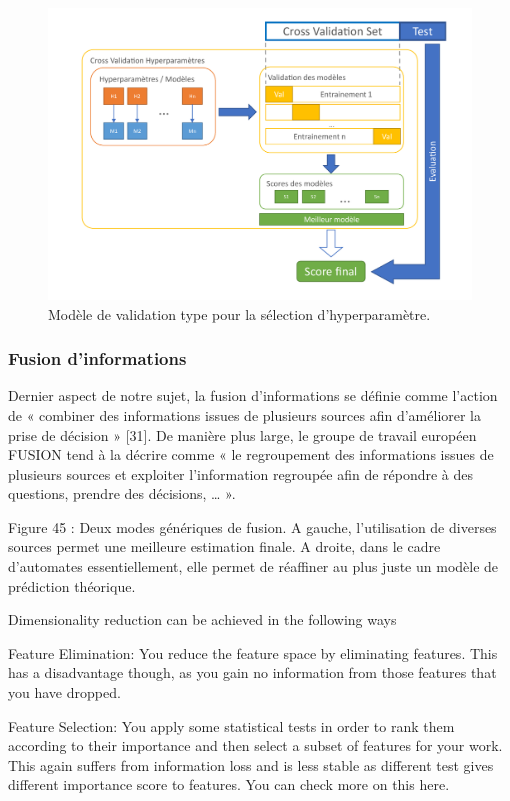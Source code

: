 \begin{figure}[H]
    \centering
    \includegraphics[width=\linewidth]{contents/chapter_3/resources/HyperParameterProcess.pdf}
    \caption{Modèle de validation type pour la sélection d’hyperparamètre.}
    \label{fig:chapter_3:HyperParameterProcess}
\end{figure}

\subsubsection{Fusion d’informations}
Dernier aspect de notre sujet, la fusion d’informations se définie comme l’action de « combiner des informations issues de plusieurs sources afin d’améliorer la prise de décision » [31]. De manière plus large, le groupe de travail européen FUSION tend à la décrire comme « le regroupement des informations issues de plusieurs sources et exploiter l’information regroupée afin de répondre à des questions, prendre des décisions, … ».
 
Figure 45 : Deux modes génériques de fusion. A gauche, l’utilisation de diverses sources permet une meilleure estimation finale. A droite, dans le cadre d’automates essentiellement, elle permet de réaffiner au plus juste un modèle de prédiction théorique.


Dimensionality reduction can be achieved in the following ways

	Feature Elimination: You reduce the feature space by eliminating features. This has a disadvantage though, as you gain no information from those features that you have dropped.

	Feature Selection: You apply some statistical tests in order to rank them according to their importance and then select a subset of features for your work. This again suffers from information loss and is less stable as different test gives different importance score to features. You can check more on this here.

